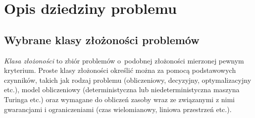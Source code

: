 \section{Opis dziedziny problemu}\label{Section_Domain}
\subsection{Wybrane klasy złożoności problemów}\label{subsection_p_np}
\par{
  \emph{Klasa złożoności} to zbiór problemów o~podobnej złożoności mierzonej pewnym kryterium. 
  Proste klasy złożoności określić można za pomocą podstawowych czynników, takich jak rodzaj problemu (obliczeniowy, decyzyjny, optymalizacyjny etc.), model  obliczeniowy (deterministyczna lub niedeterministyczna maszyna Turinga etc.)
  oraz wymagane do obliczeń zasoby wraz ze związanymi z nimi gwarancjami i ograniczeniami (czas wielomianowy, liniowa przestrzeń etc.).
}

